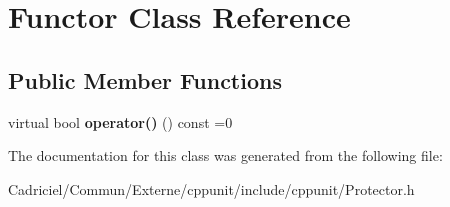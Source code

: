 \hypertarget{class_functor}{\section{Functor Class Reference}
\label{class_functor}
}
\subsection*{Public Member Functions}
\begin{DoxyCompactItemize}
\item 
\hypertarget{class_functor_a075ab7f3b1e7ace202e650670556acbd}{virtual bool {\bfseries operator()} () const =0}\label{class_functor_a075ab7f3b1e7ace202e650670556acbd}

\end{DoxyCompactItemize}


The documentation for this class was generated from the following file\-:\begin{DoxyCompactItemize}
\item 
Cadriciel/\-Commun/\-Externe/cppunit/include/cppunit/Protector.\-h\end{DoxyCompactItemize}
